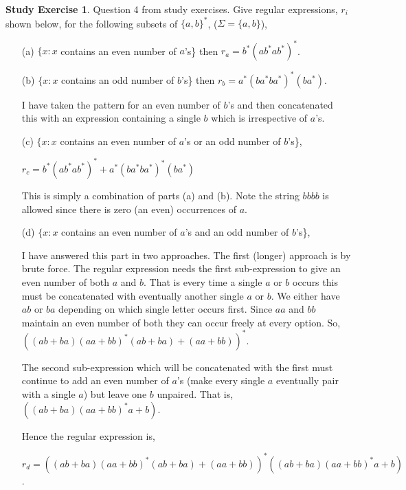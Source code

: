\documentclass[a4paper,12pt]{report}
\theoremstyle{definition}
\newtheorem{exercise}{Study Exercise}[]
\begin{document}
\begin{exercise}
Question 4 from study exercises. Give regular expressions, $r_i$ shown below, for the following subsets of $\{a,b\}^*$, ($\Sigma=\{a,b\}$),
\begin{itemize}
    \item [(a)]$\{x : x$ contains an even number of $a$'s\} then $r_a = b^*(ab^*ab^*)^*$.
    \item [(b)]$\{x:x$ contains an odd number of $b$'s\} then $r_b=a^*(ba^*ba^*)^*(ba^*)$.
    
    I have taken the pattern for an even number of $b$'s and then concatenated this with an expression containing a single $b$ which is irrespective of $a$'s.

    \item [(c)] $\{ x: x$ contains an even number of $a$'s or an odd number of $b$'s\}, 
    
    $r_c=b^*(ab^*ab^*)^*+a^*(ba^*ba^*)^*(ba^*)$
    
    This is simply a combination of parts (a) and (b). Note the string $bbbb$ is allowed since there is zero (an even) occurrences of $a$.
    \item[(d)] $\{ x: x$ contains an even number of $a$'s and an odd number of $b$'s\},
    
   I have answered this part in two approaches. The first (longer) approach is by brute force. The regular expression needs the first sub-expression to give an even number of both $a$ and $b$. That is every time a single $a$ or $b$ occurs this must be concatenated with eventually another single $a$ or $b$. We either have $ab$ or $ba$ depending on which single letter occurs first. Since $aa$ and $bb$ maintain an even number of both they can occur freely at every option. So,
    $((ab+ba)(aa+bb)^*(ab+ba)+(aa+bb))^*$. 
    
    The second sub-expression which will be concatenated with the first must continue to add an even number of $a$'s (make every single $a$ eventually pair with a single $a$) but leave one $b$ unpaired.  That is, 
    $((ab+ba)(aa+bb)^*a + b)$. 
    
    Hence the regular expression is, 
    
    $r_d=((ab+ba)(aa+bb)^*(ab+ba)+(aa+bb))^*((ab+ba)(aa+bb)^*a + b)$.
    

\end{itemize}
\end{exercise}
\end{document}
